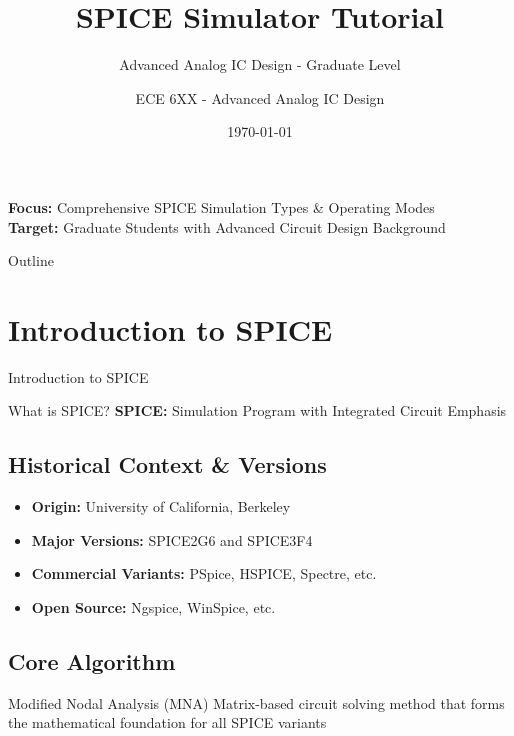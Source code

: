 \documentclass{beamer}
\title{SPICE Simulator Tutorial}
\subtitle{Advanced Analog IC Design - Graduate Level}
\author{ECE 6XX - Advanced Analog IC Design}
\institute{Graduate Course}
\date{\today}
\begin{document}
\begin{frame}
    \titlepage
    \begin{center}
        \textbf{Focus:} Comprehensive SPICE Simulation Types \& Operating Modes \\
        \textbf{Target:} Graduate Students with Advanced Circuit Design Background
    \end{center}
\end{frame}

\begin{frame}{Outline}
    \tableofcontents
\end{frame}

\section{Introduction to SPICE}

\begin{frame}{Introduction to SPICE}
    \begin{block}{What is SPICE?}
        \textbf{SPICE:} Simulation Program with Integrated Circuit Emphasis
    \end{block}
    
    \subsection{Historical Context \& Versions}
    \begin{itemize}
        \item \textbf{Origin:} University of California, Berkeley
        \item \textbf{Major Versions:} SPICE2G6 and SPICE3F4
        \item \textbf{Commercial Variants:} PSpice, HSPICE, Spectre, etc.
        \item \textbf{Open Source:} Ngspice, WinSpice, etc.
    \end{itemize}
    
    \subsection{Core Algorithm}
    \begin{alertblock}{Modified Nodal Analysis (MNA)}
        Matrix-based circuit solving method that forms the mathematical foundation for all SPICE variants
    \end{alertblock}
\end{frame}
\end{document}

